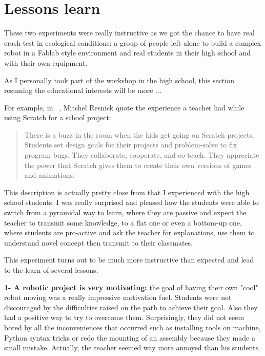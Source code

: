 \section{Lessons learn} %

These two experiments were really instructive as we got the chance to have real crash-test in ecological conditions: a group of people left alone to build a complex robot in a Fablab style environment and real students in their high school and with their own equipment.

As I personally took part of the workshop in the high school, this section resuming the educational interests will be more ...

For example, in ~\cite{resnick2008sowing}, Mitchel Resnick quote the experience a teacher had while using Scratch for a school project:
\begin{quotation}
    There is a buzz in the room when the kids get going on Scratch projects. Students set design goals for their projects and problem-solve to fix program bugs. They collaborate, cooperate, and co-teach. They appreciate the power that Scratch gives them to create their own versions of games and animations.

\end{quotation}

This description is actually pretty close from that I experienced with the high school students. I was really surprised and pleased how the students were able to switch from a pyramidal way to learn, where they are passive and expect the teacher to transmit some knowledge, to a flat one or even a bottom-up one, where students are pro-active and ask the teacher for explanations, use them to understand novel concept then transmit to their classmates.

This experiment turns out to be much more instructive than expected and lead to the learn of several lessons:

\textbf{1- A robotic project is very motivating:} the goal of having their own "cool" robot moving was a really impressive motivation fuel. Students were not discouraged by the difficulties raised on the path to achieve their goal. Also they had a positive way to try to overcome them. Surprisingly, they did not seem bored by all the inconveniences that occurred such as installing tools on machine, Python syntax tricks or redo the mounting of an assembly because they made a small mistake. Actually, the teacher seemed way more annoyed than his students.

